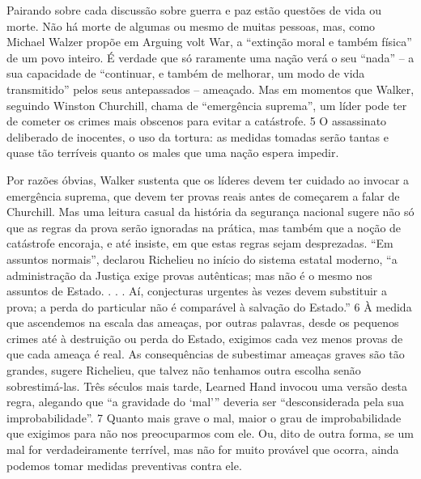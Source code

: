 \par
 
Pairando sobre cada discussão sobre guerra e paz estão questões de vida ou morte. Não há morte de algumas ou mesmo de muitas pessoas, mas, como Michael Walzer propõe em Arguing volt War, a “extinção moral e também física” de um povo inteiro. É verdade que só raramente uma nação verá o seu “nada” – a sua capacidade de “continuar, e também de melhorar, um modo de vida transmitido” pelos seus antepassados ​​– ameaçado. Mas em momentos que Walker, seguindo Winston Churchill, chama de “emergência suprema”, um líder pode ter de cometer os crimes mais obscenos para evitar a catástrofe.
 {\color{blue} 5}  
O assassinato deliberado de inocentes, o uso da tortura: as medidas tomadas serão tantas e quase tão terríveis quanto os males que uma nação espera impedir.
 
\par
 
Por razões óbvias, Walker sustenta que os líderes devem ter cuidado ao invocar a emergência suprema, que devem ter provas reais antes de começarem a falar de Churchill. Mas uma leitura casual da história da segurança nacional sugere não só que as regras da prova serão ignoradas na prática, mas também que a noção de catástrofe encoraja, e até insiste, em que estas regras sejam desprezadas. “Em assuntos normais”, declarou Richelieu no início do sistema estatal moderno, “a administração da Justiça exige provas autênticas; mas não é o mesmo nos assuntos de Estado. . . . Aí, conjecturas urgentes às vezes devem substituir a prova; a perda do particular não é comparável à salvação do Estado.”
 {\color{blue} 6}  
À medida que ascendemos na escala das ameaças, por outras palavras, desde os pequenos crimes até à destruição ou perda do Estado, exigimos cada vez menos provas de que cada ameaça é real. As consequências de subestimar ameaças graves são tão grandes, sugere Richelieu, que talvez não tenhamos outra escolha senão sobrestimá-las. Três séculos mais tarde, Learned Hand invocou uma versão desta regra, alegando que “a gravidade do ‘mal’” deveria ser “desconsiderada pela sua improbabilidade”.
 {\color{blue} 7}  
Quanto mais grave o mal, maior o grau de improbabilidade que exigimos para não nos preocuparmos com ele. Ou, dito de outra forma, se um mal for verdadeiramente terrível, mas não for muito provável que ocorra, ainda podemos tomar medidas preventivas contra ele.
 
\par
 
